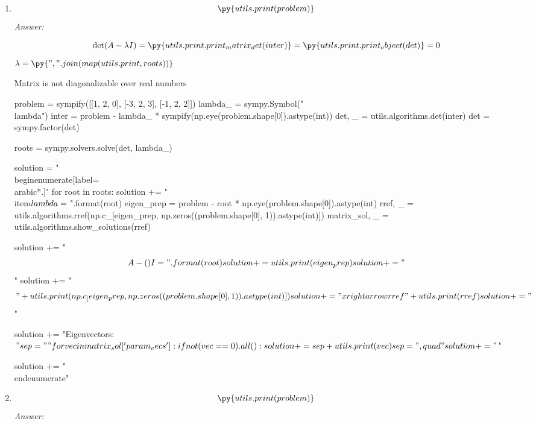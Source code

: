 \documentclass[letterpaper]{article}
\newcommand{\ans}{\textit{Answer: }}
\newenvironment{question}[2][Question]{\begin{trivlist}
\item[\hskip \labelsep {\bfseries #1}\hskip \labelsep {\bfseries #2.}]}{\end{trivlist}}
\newcommand{\printobj}[1]{\py{utils.print.print_object(#1)}}
\begin{document}
\begin{question}{5.5}
\begin{enumerate}[label=\textbf{(\alph*)}]
\begin{pycode}
    \end{pycode}

    \item $$\py{utils.print(problem)}$$
    \ans

    $$\det(A - \lambda I) = \py{utils.print.print_matrix_det(inter)} = \printobj{det} = 0$$
    $\lambda = \py{", ".join(map(utils.print, roots))}$


    Matrix is not diagonalizable over real numbers
    \begin{pycode}
problem = sympify([[1, 2, 0], [-3, 2, 3], [-1, 2, 2]])
lambda_ = sympy.Symbol("\\lambda")
inter = problem - lambda_ * sympify(np.eye(problem.shape[0]).astype(int))
det, _ = utils.algorithms.det(inter)
det = sympy.factor(det)

roots = sympy.solvers.solve(det, lambda_)

solution = "\\begin{enumerate}[label=\\arabic*.]\n"
for root in roots:
  solution += "\\item$\\lambda = {}$\n".format(root)
  eigen_prep = problem - root * np.eye(problem.shape[0]).astype(int)
  rref, _ = utils.algorithms.rref(np.c_[eigen_prep, np.zeros((problem.shape[0], 1)).astype(int)])
  matrix_sol, _ = utils.algorithms.show_solutions(rref)

  solution += "$$A - ({}) I = ".format(root)
  solution += utils.print(eigen_prep)
  solution += "$$\n"
  solution += "$$" + utils.print(np.c_[eigen_prep, np.zeros((problem.shape[0], 1)).astype(int)])
  solution += "\\xrightarrow{rref}" + utils.print(rref)
  solution += "$$\n"

  solution += "Eigenvectors: $"

  sep = ""
  for vec in matrix_sol['param_vecs']:
    if not (vec == 0).all():
      solution += sep + utils.print(vec)
      sep = ",\\quad"

  solution += "$\n"

solution += "\\end{enumerate}"

    \end{pycode}

    \item $$\py{utils.print(problem)}$$
    \ans


\end{enumerate}
\end{question}
\end{document}
